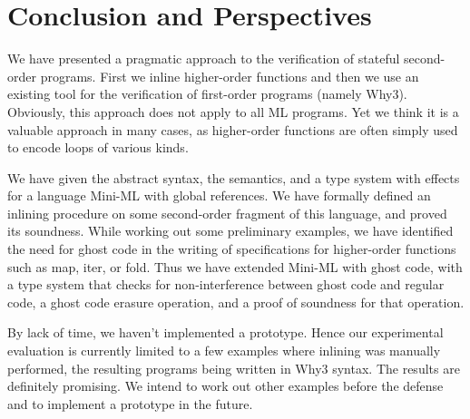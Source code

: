 \documentclass[a4paper,11pt,oneside]{article}
\theoremstyle{plain}
\newcommand{\inlsrc}{\textit{ML}^{^2}}
\begin{document}



 	


\newpage
\section{Conclusion and Perspectives}

We have presented a pragmatic approach to the verification of stateful
second-order programs. First we inline
higher-order functions and then we use an existing tool for the
verification of first-order programs (namely Why3). Obviously, this
approach does not apply to all ML programs. Yet we think it is a
valuable approach in many cases, as higher-order functions are often
simply used to encode loops of various kinds.

We have given the abstract syntax, the semantics, and a type system
with effects for a language Mini-ML with global references. We have
formally defined an inlining procedure on some second-order fragment
of this language, and proved its soundness. While working out some
preliminary examples, we have identified the need for ghost code in
the writing of specifications for higher-order functions such as map,
iter, or fold. Thus we have extended Mini-ML with ghost code, with a
type system that checks for non-interference between ghost code and
regular code, a ghost code erasure operation, and a proof of
soundness for that operation.

By lack of time, we haven't implemented a prototype. Hence our
experimental evaluation is currently limited to a few examples where
inlining was manually performed, the resulting programs being written in
Why3 syntax. The results are definitely promising.
We intend to work out other examples before the defense
and to implement a prototype in the future.
\end{document}
